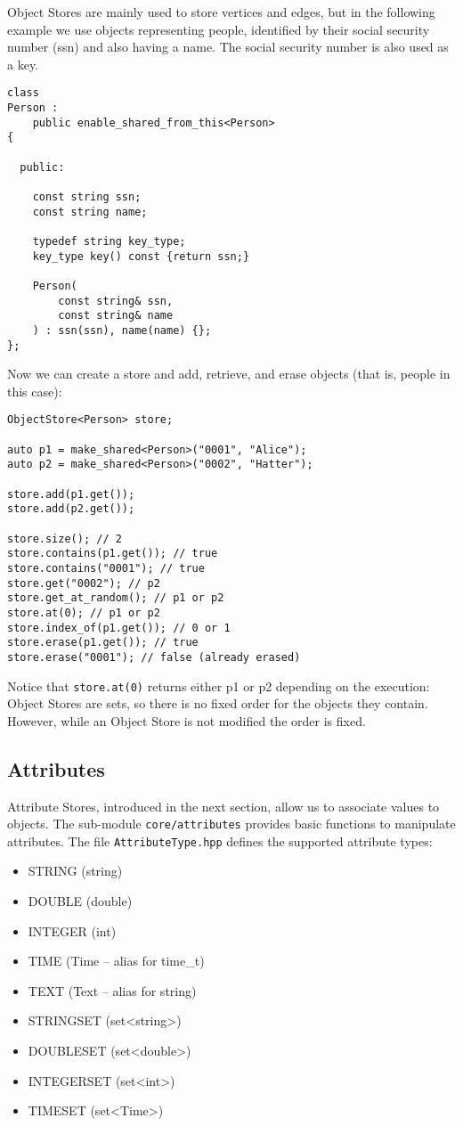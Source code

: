 Object Stores are mainly used to store vertices and edges, but in the following example we use objects representing people, identified by their social security number (ssn) and also having a name. The social security number is also used as a key.
\begin{lstlisting}[style=c++]
class
Person :
    public enable_shared_from_this<Person>
{
    
  public:
    
    const string ssn;
    const string name;
    
    typedef string key_type;
    key_type key() const {return ssn;}
    
    Person(
        const string& ssn, 
        const string& name
    ) : ssn(ssn), name(name) {};
};
\end{lstlisting}
Now we can create a store and add, retrieve, and erase objects (that is, people in this case):
\begin{lstlisting}[style=c++]
ObjectStore<Person> store;

auto p1 = make_shared<Person>("0001", "Alice");
auto p2 = make_shared<Person>("0002", "Hatter");

store.add(p1.get());
store.add(p2.get());

store.size(); // 2
store.contains(p1.get()); // true
store.contains("0001"); // true
store.get("0002"); // p2
store.get_at_random(); // p1 or p2
store.at(0); // p1 or p2
store.index_of(p1.get()); // 0 or 1
store.erase(p1.get()); // true
store.erase("0001"); // false (already erased)
\end{lstlisting}
Notice that \texttt{store.at(0)} returns either p1 or p2 depending on the execution: Object Stores are sets, so  there is no fixed order for the objects they contain. However, while an Object Store is not modified the order is fixed.


\subsection{Attributes}

Attribute Stores, introduced in the next section, allow us to associate values to objects. The sub-module \texttt{core/attributes} provides basic functions to manipulate attributes. The file \texttt{AttributeType.hpp} defines the supported attribute types:
\begin{itemize}
    \item STRING (string)
    \item DOUBLE (double)
    \item INTEGER (int)
    \item TIME (Time -- alias for time\_t)
    \item TEXT (Text -- alias for string)
    \item STRINGSET (set<string>)
    \item DOUBLESET (set<double>)
    \item INTEGERSET (set<int>)
    \item TIMESET (set<Time>)
\end{itemize}

